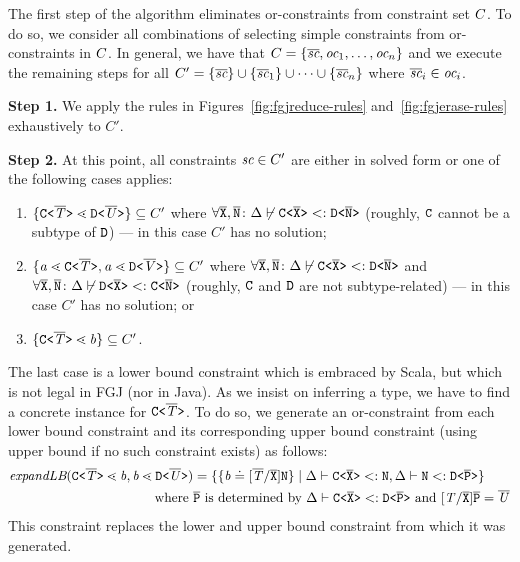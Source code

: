 The first step of the algorithm eliminates or-constraints from constraint set $C$. To do so,
we consider all combinations of selecting simple constraints from
or-constraints in $C$. In general, we have that $C =
\{ \overline{\textit{sc}}, \textit{oc}_1, \dots, \textit{oc}_n \}$ and we
execute the remaining steps for all $C' = \{ \overline{\textit{sc}} \}
\cup \{ \overline{\textit{sc}}_1 \} \cup \dots \cup
\{ \overline{\textit{sc}}_n \}$ where $\overline{\textit{sc}}_i \in
\textit{oc}_i$. 



\textbf{Step 1.} We apply the rules in Figures~\ref{fig:fgjreduce-rules}
and~\ref{fig:fgjerase-rules} exhaustively to $C'$.

\textbf{Step 2.} At this point, all
constraints $ \textit{sc} \in C'$ are either in solved form or one of the following
cases applies:
\begin{enumerate}
\item $\{ \mathtt{C \texttt{<} \overline{\mathit{T}} \texttt{>} } \lessdot \mathtt{D \texttt{<} \overline{\mathit{U}} \texttt{>} } \}
  \subseteq C'$ where $\forall\overline{\tt X},\overline{\tt N}\colon \Delta \not\vdash \mathtt{C \texttt{<} \overline{\tt X} \texttt{>} } <:
  \mathtt{D \texttt{<} \overline{\tt N} \texttt{>} }$ (roughly, ${\tt C}$ cannot be a subtype of ${\tt D}$) --- in this case $C'$ has no solution;
\item $\{ \mathit{ a } \lessdot \mathtt{C \texttt{<} \overline{\mathit{T}} \texttt{>} }, \mathit{ a } \lessdot
    \mathtt{D \texttt{<} \overline{\mathit{V}} \texttt{>} } \} \subseteq C'$ where
  $\forall\overline{\tt X},\overline{\tt N}\colon \Delta \not\vdash \mathtt{C \texttt{<} \overline{\tt X} \texttt{>} } <:
  \mathtt{D \texttt{<} \overline{\tt N} \texttt{>} } $ and $\forall\overline{\tt X},\overline{\tt N}\colon \Delta \not\vdash \mathtt{D \texttt{<} \overline{\tt X} \texttt{>} } <:
  \mathtt{C \texttt{<} \overline{\tt N} \texttt{>} }$ (roughly, ${\tt C}$ and ${\tt D}$ are not
  subtype-related) --- in this case $C'$ has no solution; or
\item $\{ \mathtt{C \texttt{<} \overline{\mathit{T}} \texttt{>} } \lessdot \mathit{ b } \} \subseteq C'$.
\end{enumerate}
The last case is a lower bound constraint which is embraced by Scala,
but which is not legal in FGJ (nor in Java). As we insist on inferring
a type, we have to find a concrete instance for
$\mathtt{C \texttt{<} \overline{\mathit{T}} \texttt{>} }$. To do so, we generate an or-constraint from
each lower bound constraint and its corresponding upper bound constraint (using upper bound  if no such constraint exists) as follows:
\begin{align*}
  \textit{expandLB} (\mathtt{C \texttt{<} \overline{\mathit{T}} \texttt{>} } \lessdot \mathit{ b }, \mathit{ b } \lessdot \mathtt{D \texttt{<} \overline{\mathit{U}} \texttt{>} })
  & = \{  \{  \mathit{ b } \doteq [\overline{\mathit{T}}/\overline{\tt X}]\texttt{N}  \} \mid
    \Delta \vdash \mathtt{C \texttt{<} \overline{\texttt{X}} \texttt{>} } <: \texttt{N},
    \Delta \vdash \texttt{N} <:  \mathtt{D \texttt{<} \overline{P} \texttt{>} } \}
  \\ \text{where }&\overline{\tt P}\text{ is determined by }\Delta \vdash \mathtt{C \texttt{<} \overline{\texttt{X}} \texttt{>} } <: \mathtt{D \texttt{<} \overline{\tt P} \texttt{>} } \text{ and
  } [\mathit{T}/\overline{\tt X}]\overline{\tt P} = \overline{\mathit{U}}
\end{align*}
This constraint replaces the lower and upper bound constraint from which it was generated.

